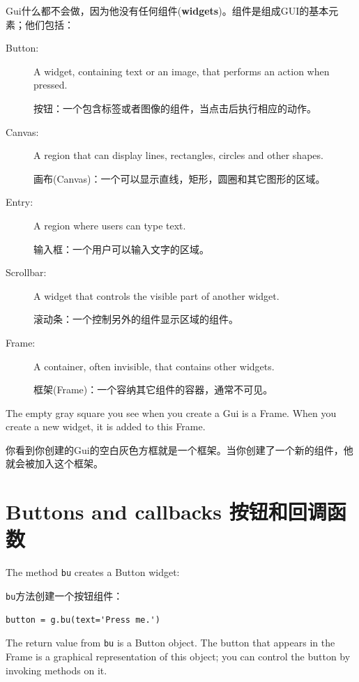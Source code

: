 \documentclass[10pt]{book}
\begin{document}
\begin{CJK}{UTF8}{gbsn}
Gui什么都不会做，因为他没有任何组件({\bf widgets})。组件是组成GUI的基本元素；他们包括：

\begin{description}

\item[Button:] A widget, containing text or an image, that
performs an action when pressed.

按钮：一个包含标签或者图像的组件，当点击后执行相应的动作。

\item[Canvas:] A region that can display lines, rectangles,
circles and other shapes.

画布(Canvas)：一个可以显示直线，矩形，圆圈和其它图形的区域。

\item[Entry:] A region where users can type text.

    输入框：一个用户可以输入文字的区域。

\item[Scrollbar:] A widget that controls the visible part of another
widget.

滚动条：一个控制另外的组件显示区域的组件。

\item[Frame:] A container, often invisible, that contains other
widgets.

框架(Frame)：一个容纳其它组件的容器，通常不可见。

\end{description}

The empty gray square you see when you create a Gui is
a Frame.  When you create a new widget, it is added to this Frame.

你看到你创建的Gui的空白灰色方框就是一个框架。当你创建了一个新的组件，他就会被加入这个框架。

\section{Buttons and callbacks  按钮和回调函数}

The method {\tt bu} creates a Button widget:

{\tt bu}方法创建一个按钮组件：

\begin{verbatim}
button = g.bu(text='Press me.')
\end{verbatim}
%
The return value from {\tt bu} is a Button object.  The button
that appears in the Frame is a graphical representation of this
object; you can control the button by invoking methods on it.


\end{CJK}
\end{document}
